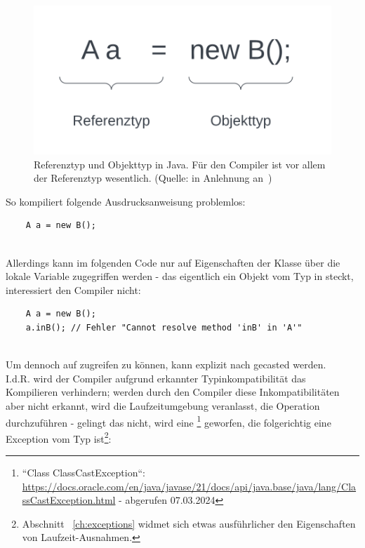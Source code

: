 \begin{figure}
    \begin{center}
        \includegraphics[scale=0.5]{chapters/OOP/img/types}
        \caption{Referenztyp und Objekttyp in Java. Für den Compiler ist vor allem der Referenztyp wesentlich. (Quelle: in Anlehnung an~\cite[467 f., ``Begrifflichkeit``]{Ull23})}
        \label{fig:types}
    \end{center}
\end{figure}

\noindent
So kompiliert folgende Ausdrucksanweisung problemlos:

\begin{verbatim}
    A a = new B();
\end{verbatim}\\

\noindent
Allerdings kann im folgenden Code nur auf Eigenschaften der Klasse  über die lokale Variable  zugegriffen werden - das eigentlich ein Objekt vom Typ  in  steckt, interessiert den Compiler nicht:\\

\begin{verbatim}
    A a = new B();
    a.inB(); // Fehler "Cannot resolve method 'inB' in 'A'"
\end{verbatim}\\


\noindent
Um dennoch auf  zugreifen zu können, kann  explizit nach  gecasted werden.\\
\noindent
I.d.R. wird der Compiler aufgrund erkannter Typinkompatibilität das Kompilieren verhindern; werden durch den Compiler diese Inkompatibilitäten aber nicht erkannt, wird die Laufzeitumgebung veranlasst, die Operation durchzuführen - gelingt das nicht, wird eine \footnote{
``Class ClassCastException``: \url{https://docs.oracle.com/en/java/javase/21/docs/api/java.base/java/lang/ClassCastException.html} - abgerufen 07.03.2024
} geworfen, die folgerichtig eine Exception vom Typ  ist\footnote{
Abschnitt ~\ref{ch:exceptions} widmet sich etwas ausführlicher den Eigenschaften von Laufzeit-Ausnahmen.
}:

